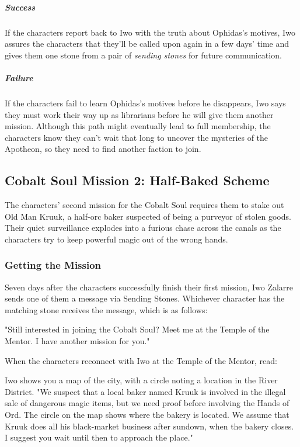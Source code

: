 \documentclass[10pt,a4paper,twoside,fancy,bg=print,twocolumn,openany,nodeprecatedcode]{dndbook}
\begin{document}
\subparagraph{Success}
If the characters report back to Iwo with the truth about Ophidas's motives, Iwo assures the characters that they'll be called upon again in a few days' time and gives them one stone from a pair of \textit{sending stones} for future communication.

\subparagraph{Failure}
If the characters fail to learn Ophidas's motives before he disappears, Iwo says they must work their way up as librarians before he will give them another mission. Although this path might eventually lead to full membership, the characters know they can't wait that long to uncover the mysteries of the Apotheon, so they need to find another faction to join.

\subsection{Cobalt Soul Mission 2: Half-Baked Scheme}
The characters' second mission for the Cobalt Soul requires them to stake out Old Man Kruuk, a half-orc baker suspected of being a purveyor of stolen goods. Their quiet surveillance explodes into a furious chase across the canals as the characters try to keep powerful magic out of the wrong hands.

\subsubsection{Getting the Mission}
Seven days after the characters successfully finish their first mission, Iwo Zalarre sends one of them a message via Sending Stones. Whichever character has the matching stone receives the message, which is as follows:

\begin{DndReadAloud}{}
"Still interested in joining the Cobalt Soul? Meet me at the Temple of the Mentor. I have another mission for you."

\end{DndReadAloud}

When the characters reconnect with Iwo at the Temple of the Mentor, read:

\begin{DndReadAloud}{}
Iwo shows you a map of the city, with a circle noting a location in the River District. "We suspect that a local baker named Kruuk is involved in the illegal sale of dangerous magic items, but we need proof before involving the Hands of Ord. The circle on the map shows where the bakery is located. We assume that Kruuk does all his black-market business after sundown, when the bakery closes. I suggest you wait until then to approach the place."

\end{DndReadAloud}
\end{document}
